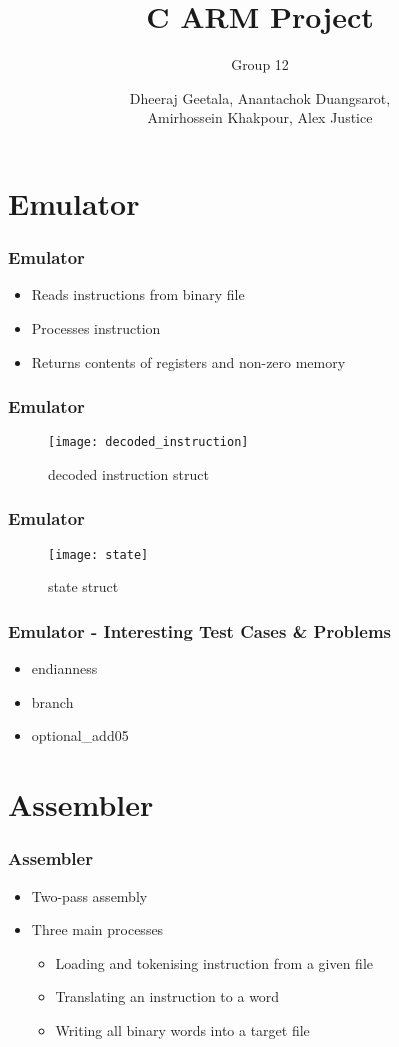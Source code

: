 \documentclass[12pt]{beamer}
\title{C ARM Project}
\date{Dheeraj Geetala, Anantachok Duangsarot, \\Amirhossein Khakpour, Alex Justice}
\author{Group 12}
\begin{document}
\begin{frame}
\titlepage
\end{frame}

\section{Emulator}
\begin{frame}
\frametitle{Emulator}
\begin{itemize}
\item Reads instructions from binary file
\item Processes instruction
\item Returns contents of registers and non-zero memory
\end{itemize}
\end{frame}

\begin{frame}
\frametitle{Emulator}
\begin{figure}
\texttt{[image: decoded\_instruction]}
\caption{decoded instruction struct}
\end{figure}
\end{frame}

\begin{frame}
\frametitle{Emulator}
\begin{figure}
\texttt{[image: state]}
\caption{state struct}
\end{figure}
\end{frame}

\begin{frame}
\frametitle{Emulator - Interesting Test Cases \& Problems}
\begin{itemize}
\item endianness
\item branch
\item optional\_add05  
\end{itemize}
\end{frame}


\section{Assembler}
\begin{frame}
\frametitle{Assembler}
\begin{itemize}
\item Two-pass assembly
\item Three main processes
\begin{itemize}
\item Loading and tokenising instruction from a given file
\item Translating an instruction to a word
\item Writing all binary words into a target file
\end{itemize}
\end{itemize}
\end{frame}
\end{document}
